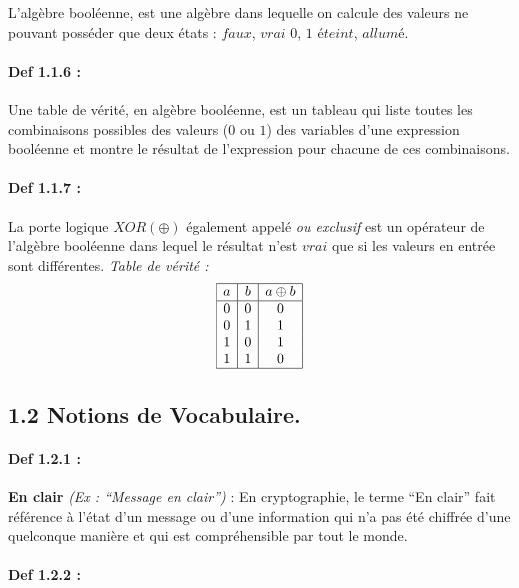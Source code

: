 \documentclass[
  paper=a4,
  ,captions=tableheading
]{scrartcl}
\begin{document}
L'algèbre booléenne, est une algèbre dans lequelle on calcule des
valeurs ne pouvant posséder que deux états : \(faux\), \(vrai\)
\textbar{} \(0\), \(1\) \textbar{} \(éteint\), \(allumé\).

\paragraph{Def 1.1.6 :}\label{def-1.1.6}

Une table de vérité, en algèbre booléenne, est un tableau qui liste
toutes les combinaisons possibles des valeurs (\(0\) ou \(1\)) des
variables d'une expression booléenne et montre le résultat de
l'expression pour chacune de ces combinaisons.

\paragraph{Def 1.1.7 :}\label{def-1.1.7}

La porte logique \(XOR (\oplus)\) également appelé \emph{ou exclusif}
est un opérateur de l'algèbre booléenne dans lequel le résultat n'est
\(vrai\) que si les valeurs en entrée sont différentes. \emph{Table de
vérité :} \[
\begin{array}{|c|c|c|}
\hline
a & b & a \oplus b \\
\hline
0 & 0 & 0 \\
0 & 1 & 1 \\
1 & 0 & 1 \\
1 & 1 & 0 \\
\hline
\end{array}
\]

\subsection{1.2 Notions de Vocabulaire.}\label{notions-de-vocabulaire.}

\paragraph{Def 1.2.1 :}\label{def-1.2.1}

\textbf{En clair} \emph{(Ex : ``Message en clair'')} : En cryptographie,
le terme ``En clair'' fait référence à l'état d'un message ou d'une
information qui n'a pas été chiffrée d'une quelconque manière et qui est
compréhensible par tout le monde.

\paragraph{Def 1.2.2 :}\label{def-1.2.2}
\end{document}
